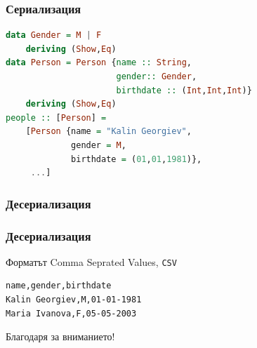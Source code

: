 \documentclass{beamer}
\begin{document}
\begin{frame}[fragile]
  \frametitle{Сериализация}

\begin{lstlisting}[basicstyle=\small,language=Haskell]
data Gender = M | F
    deriving (Show,Eq)
data Person = Person {name :: String, 
                      gender:: Gender, 
                      birthdate :: (Int,Int,Int)}
    deriving (Show,Eq)
people :: [Person] = 
    [Person {name = "Kalin Georgiev", 
             gender = M, 
             birthdate = (01,01,1981)},
     ...]
\end{lstlisting}

\end{frame}


\begin{frame}[fragile]
  \frametitle{Десериализация}
\end{frame}



\begin{frame}[fragile]
  \frametitle{Десериализация}

Форматът Comma Seprated Values, \verb#CSV#

\begin{verbatim}
name,gender,birthdate
Kalin Georgiev,M,01-01-1981
Maria Ivanova,F,05-05-2003
\end{verbatim}

\end{frame}


\begin{frame}
  \centerline{Благодаря за вниманието!}
\end{frame}
\end{document}
